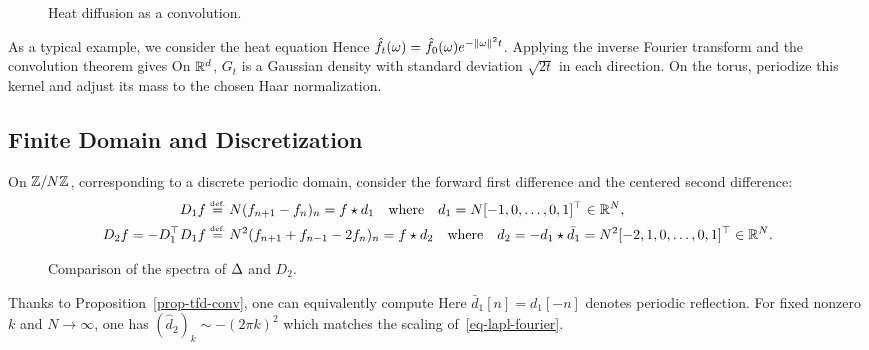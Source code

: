\begin{figure}[tbp]
\centering
{}
\caption{Heat diffusion as a convolution.}
\label{fig-heat}
\end{figure}

As a typical example, we consider the heat equation
Hence $\hat f_t(\omega) = \hat f_0(\omega) e^{-\lVert\omega\rVert^2 t}$. Applying the inverse Fourier transform and the convolution theorem gives
On $\mathbb{R}^d$, $G_t$ is a Gaussian density with standard deviation $\sqrt{2t}$ in each direction. On the torus, periodize this kernel and adjust its mass to the chosen Haar normalization.


\subsection{Finite Domain and Discretization}

On $\mathbb{Z}/N\mathbb{Z}$, corresponding to a discrete periodic domain, consider the forward first difference and the centered second difference:
\begin{align}\label{eq-disc-diff-1}
	D_1 f &\stackrel{\mbox{\upshape\tiny def.}}{=} N(f_{n+1}-f_n)_n=f\star d_1\quad \text{where} \quad d_1=N[-1,0,\ldots,0,1]^\top \in \mathbb{R}^N, \\
	\label{eq-disc-diff-2}
	D_2 f=-D_1^\top D_1 f & \stackrel{\mbox{\upshape\tiny def.}}{=} N^2 (f_{n+1}+f_{n-1}-2f_n)_n = f \star d_2 \quad \text{where} \quad d_2=-d_1\star\bar d_1=N^2[-2,1,0,\ldots,0,1]^\top \in \mathbb{R}^N.
\end{align}
\begin{figure}[tbp]
\centering
{}
\caption{Comparison of the spectra of $\Delta$ and $D_2$.}
\label{fig-review-fourier-finite-difference-spectrum}
\end{figure}
Thanks to Proposition~\ref{prop-tfd-conv}, one can equivalently compute
Here $\bar d_1[n]=d_1[-n]$ denotes periodic reflection. For fixed nonzero $k$ and $N\to\infty$, one has $(\hat d_2)_k \sim -(2\pi k)^2$ which matches the scaling of~\eqref{eq-lapl-fourier}.


